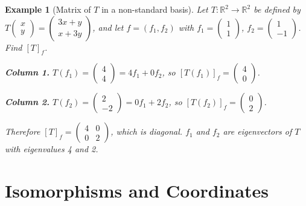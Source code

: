 \documentclass{article}
\newtheorem*{example}{Example}
\begin{document}
\begin{example}[Matrix of $T$ in a non-standard basis]
    Let $T:\mathbb{R}^2\to\mathbb{R}^2$ be defined by $T\begin{pmatrix}x\\y\end{pmatrix}=\begin{pmatrix}3x+y\\x+3y\end{pmatrix}$, and let $f=\left(f_1,f_2\right)$ with $f_1=\begin{pmatrix}1\\1\end{pmatrix}$, $f_2=\begin{pmatrix}1\\-1\end{pmatrix}$. Find $[T]_f$.

    \textbf{Column 1.} $T(f_1)=\begin{pmatrix}4\\4\end{pmatrix}=4f_1+0f_2$, so $[T(f_1)]_f=\begin{pmatrix}4\\0\end{pmatrix}$.

    \textbf{Column 2.} $T(f_2)=\begin{pmatrix}2\\-2\end{pmatrix}=0f_1+2f_2$, so $[T(f_2)]_f=\begin{pmatrix}0\\2\end{pmatrix}$.

    Therefore $[T]_f=\begin{pmatrix}4&0\\0&2\end{pmatrix}$, which is diagonal. $f_1$ and $f_2$ are eigenvectors of $T$ with eigenvalues 4 and 2.
\end{example}

\section{Isomorphisms and Coordinates}
\end{document}
